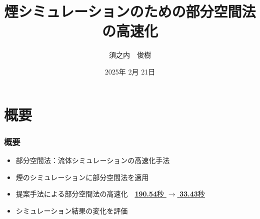 \documentclass[aspectratio=169,dvipdfmx,hyperref={bookmarks=true}]{beamer}
\title{煙シミュレーションのための部分空間法の高速化}
\author{須之内　俊樹}
\institute{中央大学理工学研究科　情報工学専攻　\\形状情報処理研究室　23N8100018B}
\date{2025年 2月 21日}
\begin{document}
   \begin{frame}
 \maketitle
 \end{frame} 
     \section{概要}
 \begin{frame}
 \frametitle{概要}
  \vspace{-10pt}
\centering

  \begin{block}{}
  \begin{itemize}
	\item 部分空間法：流体シミュレーションの高速化手法
	\item 煙のシミュレーションに部分空間法を適用
	\item 提案手法による部分空間法の高速化　\underline{\textbf{190.54}秒 $\to$ \textbf{33.43}秒}
	\item シミュレーション結果の変化を評価
\end{itemize}
\end{block}
 \end{frame}
\end{document}
